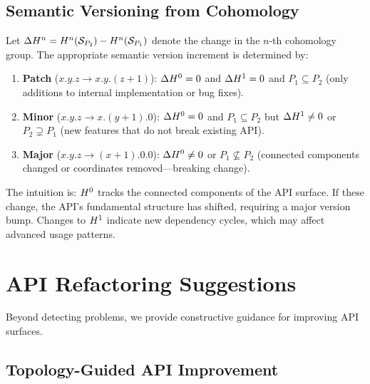 \documentclass[11pt]{article}
\begin{document}
\subsection{Semantic Versioning from Cohomology}

\begin{proposition}\label{prop:semver}
Let $\Delta H^{n} = H^{n}(\mathcal{S}_{P_2}) - H^{n}(\mathcal{S}_{P_1})$ denote
the change in the $n$-th cohomology group.  The appropriate semantic
version increment is determined by:
\begin{enumerate}[noitemsep]
  \item \textbf{Patch} ($x.y.z \to x.y.(z+1)$): $\Delta H^{0} = 0$
        and $\Delta H^{1} = 0$ and $P_1 \subseteq P_2$ (only additions
        to internal implementation or bug fixes).
  \item \textbf{Minor} ($x.y.z \to x.(y+1).0$): $\Delta H^{0} = 0$
        and $P_1 \subseteq P_2$ but $\Delta H^{1} \neq 0$ or
        $P_2 \supsetneq P_1$ (new features that do not break existing API).
  \item \textbf{Major} ($x.y.z \to (x+1).0.0$): $\Delta H^{0} \neq 0$
        or $P_1 \not\subseteq P_2$ (connected components changed or
        coordinates removed---breaking change).
\end{enumerate}
\end{proposition}

The intuition is: $H^{0}$ tracks the connected components of the API
surface.  If these change, the API's fundamental structure has shifted,
requiring a major version bump.  Changes to $H^{1}$ indicate new
dependency cycles, which may affect advanced usage patterns.

\section{API Refactoring Suggestions}\label{sec:refactoring}

Beyond detecting problems, we provide constructive guidance for improving
API surfaces.

\subsection{Topology-Guided API Improvement}
\end{document}
